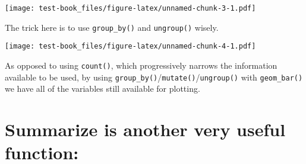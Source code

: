 \documentclass[]{book}
\newenvironment{Shaded}{\begin{snugshade}}{\end{snugshade}}
\newcommand{\DataTypeTok}[1]{\textcolor[rgb]{0.13,0.29,0.53}{#1}}
\newcommand{\DecValTok}[1]{\textcolor[rgb]{0.00,0.00,0.81}{#1}}
\newcommand{\KeywordTok}[1]{\textcolor[rgb]{0.13,0.29,0.53}{\textbf{#1}}}
\newcommand{\NormalTok}[1]{#1}
\newcommand{\OperatorTok}[1]{\textcolor[rgb]{0.81,0.36,0.00}{\textbf{#1}}}
\newcommand{\OtherTok}[1]{\textcolor[rgb]{0.56,0.35,0.01}{#1}}
\newcommand{\StringTok}[1]{\textcolor[rgb]{0.31,0.60,0.02}{#1}}
\begin{document}
\texttt{[image: test-book\_files/figure-latex/unnamed-chunk-3-1.pdf]}

The trick here is to use \texttt{group\_by()} and \texttt{ungroup()} wisely.

\begin{Shaded}
\end{Shaded}

\texttt{[image: test-book\_files/figure-latex/unnamed-chunk-4-1.pdf]}

As opposed to using \texttt{count()}, which progressively narrows the information available to be used, by using \texttt{group\_by()}/\texttt{mutate()}/\texttt{ungroup()} with \texttt{geom\_bar()} we have all of the variables still available for plotting.

\hypertarget{summarize-is-another-very-useful-function}{%
\section{Summarize is another very useful function:}\label{summarize-is-another-very-useful-function}}

\begin{Shaded}
\end{Shaded}
\end{document}
